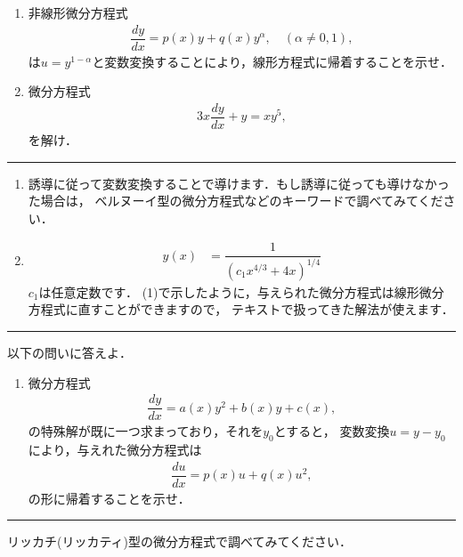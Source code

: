 \documentclass[11pt,a4]{jsarticle}
\numberwithin{equation}{section}
\begin{document}
\begin{enumerate}[(1)]
  \item 非線形微分方程式
	\begin{align*}
	   \dfrac{dy}{dx} = p(x)y + q(x)y^{\alpha},\quad (\alpha \neq 0, 1),
	\end{align*}
	は$u=y^{1-\alpha}$と変数変換することにより，線形方程式に帰着することを示せ．
  \item 微分方程式
	\begin{align*}
	  3x\dfrac{dy}{dx} + y = xy^5, 
	\end{align*}
	を解け．
\end{enumerate}
%
\hrule
\vspace*{.2cm}
%
\begin{enumerate}[(1)]
\item 誘導に従って変数変換することで導けます．もし誘導に従っても導けなかった場合は，
        ベルヌーイ型の微分方程式などのキーワードで調べてみてください．
\item 
\begin{align*}
y\left(x\right) & =\dfrac{1}{\left(c_{1}x^{4/3}+4x\right)^{1/4}}
\end{align*}
$c_1$は任意定数です．
(1)で示したように，与えられた微分方程式は線形微分方程式に直すことができますので，
テキストで扱ってきた解法が使えます．
\end{enumerate}
%
\newpage
%
\hrule
\enshu
以下の問いに答えよ．
\begin{enumerate}[(1)]
  \item 微分方程式
	\begin{align*}
	  \dfrac{dy}{dx} = a(x)y^2 + b(x)y + c(x), 
	\end{align*}
	の特殊解が既に一つ求まっており，それを$y_0$とすると，
	変数変換$u = y - y_0$により，与えれた微分方程式は
	\begin{align*}
	  \dfrac{du}{dx} = p(x)u + q(x)u^{2}, 
	\end{align*}
	の形に帰着することを示せ．
\end{enumerate}
%
\hrule
\vspace*{.2cm}

リッカチ(リッカティ)型の微分方程式で調べてみてください．
\end{document}
